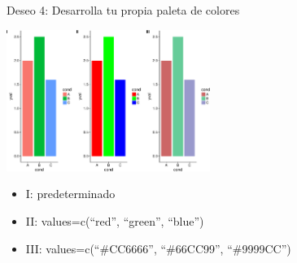 \documentclass[ignorenonframetext,]{beamer}
\providecommand{\tightlist}{%
  \setlength{\itemsep}{0pt}\setlength{\parskip}{0pt}}
\begin{document}
\begin{frame}{Deseo 4: Desarrolla tu propia paleta de colores}

\includegraphics[width=250px]{../figures/talk/unnamed-chunk-1-1}

\begin{itemize}
\tightlist
\item
  I: predeterminado
\item
  II: values=c(``red'', ``green'', ``blue'')
\item
  III: values=c(``\#CC6666'', ``\#66CC99'', ``\#9999CC'')
\end{itemize}

\end{frame}

\end{document}
